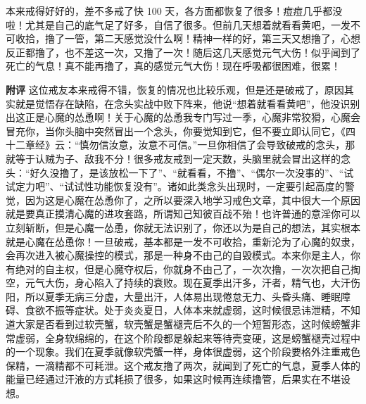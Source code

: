 \begin{case}
    本来戒得好好的，差不多戒了快 100 天，各方面都恢复了很多！痘痘几乎都没啦！尤其是自己的底气足了好多，自信了很多。但前几天想着就看看黄吧，一发不可收拾，撸了一管，第二天感觉没什么啊！精神一样的好，第三天又想撸了，心想反正都撸了，也不差这一次，又撸了一次！随后这几天感觉元气大伤！似乎闻到了死亡的气息！真不能再撸了，真的感觉元气大伤！现在呼吸都很困难，很累！

    \textbf{附评} 这位戒友本来戒得不错，恢复的情况也比较乐观，但是还是破戒了，原因其实就是觉悟存在缺陷，在念头实战中败下阵来，他说“想着就看看黄吧”，他没识别出这正是心魔的怂恿啊！关于心魔的怂恿我专门写过一季，心魔非常狡猾，心魔会冒充你，当你头脑中突然冒出一个念头，你要觉知到它，但不要立即认同它，《四十二章经》云：“慎勿信汝意，汝意不可信。”一旦你相信了会导致破戒的念头，那就等于认贼为子、敌我不分！很多戒友戒到一定天数，头脑里就会冒出这样的念头：“好久没撸了，是该放松一下了”、“就看看，不撸”、“偶尔一次没事的”、“试试定力吧”、“试试性功能恢复没有”。诸如此类念头出现时，一定要引起高度的警觉，因为这是心魔在怂恿你了，之所以要深入地学习戒色文章，其中很大一个原因就是要真正摸清心魔的进攻套路，所谓知己知彼百战不殆！也许普通的意淫你可以立刻斩断，但是心魔一怂恿，你就无法识别了，你还以为是自己的想法，其实根本就是心魔在怂恿你！一旦破戒，基本都是一发不可收拾，重新沦为了心魔的奴隶，会再次进入被心魔操控的模式，那是一种身不由己的自毁模式。本来你是主人，你有绝对的自主权，但是心魔夺权后，你就身不由己了，一次次撸，一次次把自己掏空，元气大伤，身心陷入了持续的衰败。现在夏季出汗多，汗者，精气也，大汗伤阳，所以夏季无病三分虚，大量出汗，人体易出现倦怠无力、头昏头痛、睡眠障碍、食欲不振等症状。处于炎炎夏日，人体本来就虚弱，这时候很忌讳泄精，不知道大家是否看到过软壳蟹，软壳蟹是蟹褪壳后不久的一个短暂形态，这时候螃蟹非常虚弱，全身软绵绵的，在这个阶段都是躲起来等待壳变硬，这是螃蟹褪壳过程中的一个现象。我们在夏季就像软壳蟹一样，身体很虚弱，这个阶段要格外注重戒色保精，一滴精都不可耗泄。这个戒友撸了两次，就闻到了死亡的气息，夏季人体的能量已经通过汗液的方式耗损了很多，如果这时候再连续撸管，后果实在不堪设想。
\end{case}

